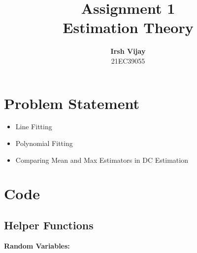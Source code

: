 \documentclass[12pt]{article}
\begin{document}
 
%
%
 
\title{\LARGE \textbf{Assignment 1} \\[1ex] Estimation Theory}

\author{
    \textbf{Irsh Vijay}\\
    21EC39055\\
}

\date{}
\maketitle

\section{Problem Statement}
\begin{itemize}
\item Line Fitting
\item Polynomial Fitting
\item Comparing Mean and Max Estimators in DC Estimation
\end{itemize}

\section{Code}
\subsection{Helper Functions}
\textbf{Random Variables:}
\end{document}
